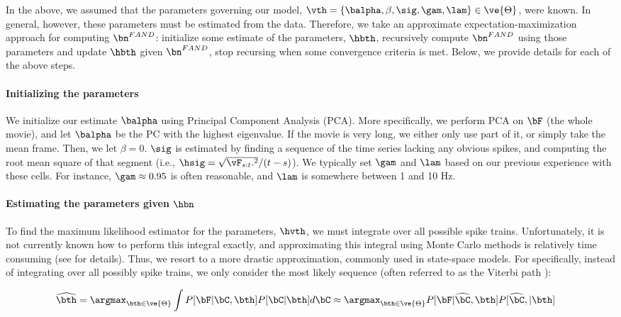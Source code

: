 In the above, we assumed that the parameters governing our model, $\vth=\{\balpha, \beta, \sig, \gam, \lam\} \in \ve{\Theta}$, were known. In general, however, these parameters must be estimated from the data. Therefore, we take an approximate expectation-maximization approach for computing $\bn^{FAND}$: initialize some estimate of the parameters, $\hbth$, recursively compute $\bn^{FAND}$ using those parameters and update $\hbth$ given $\bn^{FAND}$, stop recursing when some convergence criteria is met.  Below, we provide details for each of the above steps.

\paragraph{Initializing the parameters}

We initialize our estimate $\balpha$ using Principal Component Analysis (PCA). More specifically, we perform PCA on $\bF$ (the whole movie), and let $\balpha$ be the PC with the highest eigenvalue.  If the movie is very long, we either only use part of it, or simply take the mean frame.  Then, we let $\beta=0$.  $\sig$ is estimated by finding a sequence of the time series lacking any obvious spikes, and computing the root mean square of that segment (i.e., $\hsig=\sqrt{\vF_{s:t}.^2}/(t-s)$).  We typically set $\gam$ and $\lam$ based on our previous experience with these cells.  For instance, $\gam \approx 0.95$ is often reasonable, and $\lam$ is somewhere between 1 and 10 Hz.  

\paragraph{Estimating the parameters given $\hbn$}

To find the maximum likelihood estimator for the parameters, $\hvth$, we must integrate over all possible spike trains. Unfortunately, it is not currently known how to perform this integral exactly, and approximating this integral using Monte Carlo methods is relatively time consuming (see \cite{VogelsteinPaninski09b} for details).  Thus, we resort to a more drastic approximation, commonly used in state-space models.  For specifically, instead of integrating over all possibly spike trains, we only consider the most likely sequence (often referred to as the Viterbi path \cite{Rabiner89}): 

\begin{align} \label{eq:par1}
\widehat{\bth} &= \argmax_{\bth \in \ve{\Theta}} \int P[\bF|\bC, \bth] P[\bC | \bth]  d\bC  \approx \argmax_{\bth \in \ve{\Theta}}P[\bF| \hCm, \bth] P[\hCm, | \bth]
\end{align}

